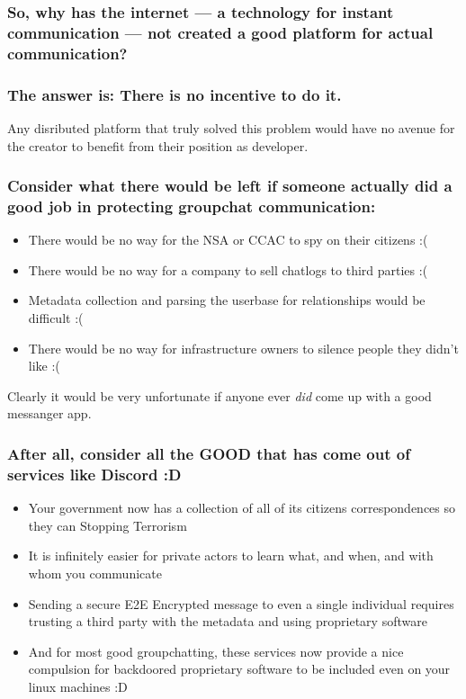 \documentclass{beamer}
\begin{document}
  \begin{frame}
      \frametitle{So, why has the internet --- a technology for instant communication --- not created a good platform for actual communication?}
  \end{frame}
  \begin{frame}
      \frametitle{The answer is: There is no incentive to do it.}
      Any disributed platform that truly solved this problem would have no avenue for the creator to benefit from their 
      position as developer.
  \end{frame}
  \begin{frame}
      \frametitle{Consider what there would be left if someone actually did a good job in protecting groupchat communication:}
      \begin{itemize}
          \item There would be no way for the NSA or CCAC to spy on their citizens :(
          \item There would be no way for a company to sell chatlogs to third parties :(
          \item Metadata collection and parsing the userbase for relationships would be difficult :(
          \item There would be no way for infrastructure owners to silence people they didn't like :(
      \end{itemize}
      Clearly it would be very unfortunate if anyone ever {\it did\/} come up with a good messanger app.
  \end{frame}
  \begin{frame}
      \frametitle{After all, consider all the GOOD that has come out of services like Discord :D}
      \begin{itemize}
          \item Your government now has a collection of all of its citizens correspondences so they can Stopping Terrorism{\texttrademark}
          \item It is infinitely easier for private actors to learn what, and when, and with whom you communicate
          \item Sending a secure E2E Encrypted message to even a single individual requires trusting a third party with the metadata and using proprietary software
          \item And for most good groupchatting, these services now provide a nice compulsion for backdoored proprietary software to be included even on your linux machines :D
      \end{itemize}
  \end{frame}
\end{document}
